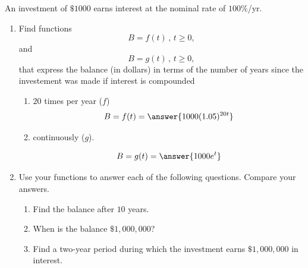 \documentclass{ximera}
\begin{document}
\begin{example} \label{ExKdf3rdf}
An investment of $\$1000$ earns interest at the nominal rate of $100\%$/yr.

\begin{enumerate}
\item Find functions 
\[
   B = f(t) \, , \, t\geq 0,
\]
and 
\[
  B = g(t) \, , \, t\geq 0,
\]
that express the balance (in dollars) in terms of the number of years since the investement was made if interest is compounded
\begin{enumerate}
\item $20$ times per year ($f$)
\[
    B = f(t) = \answer{1000(1.05)^{20t}}
\]

\item continuously ($g$).

\[
   B =  g(t) = \answer{1000e^{t}}
\]

\end{enumerate} 

\item Use your functions to answer each of the following questions. Compare your answers.

\begin{enumerate}
\item Find the balance after $10$ years.

\item When is the balance $\$1,000,000$?

\item Find a two-year period during which the investment earns $\$1,000,000$ in interest.
\end{enumerate}
\end{enumerate}

\end{example}
\end{document}
